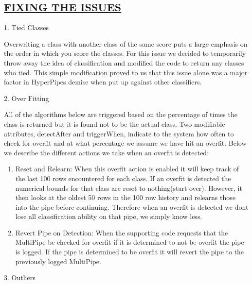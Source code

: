 \begin{kasten}
    \section*{ \hspace{0.1cm} {\color{red} \underline{FIXING THE ISSUES}}}
    \large{

      1. Tied Classes
\vspace{3 mm}

Overwriting a class with another class of the same score puts a large emphasis on 
the order in which you score the classes. For this issue we 
decided to temporarily throw away the idea of classification 
and modified the code to return any classes who tied. This 
simple modification proved to us that this issue alone was a 
major factor in HyperPipes demise when put up against other 
classifiers. 

\vspace{3 mm}
      2. Over Fitting
\vspace{3 mm}

All of the algorithms below are triggered 
based on the percentage of times the class is returned but it is 
found not to be the actual class. Two modifiable attributes, detectAfter
and triggerWhen, indicate to the system how often to check for 
overfit and at what percentage we assume we have hit an overfit. 
Below we describe the different actions we take when an overfit
is detected:
\begin{enumerate}
\item Reset and Relearn: 
	When this overfit action is enabled it will keep track of the 
	last 100 rows encountered for each class. If an overfit is detected 
	the numerical bounds for that class are reset to nothing(start over).
	However, it then looks at the oldest 50 rows in the 100 row history 
	and relearns those into the pipe before continuing. Therefore when
	an overfit is detected we dont lose all classification ability on that
	pipe, we simply know less.
\item Revert Pipe on Detection:
	When the supporting code requests that the MultiPipe
	be checked for overfit if it is determined to not be overfit the 
	pipe is logged. If the pipe is determined to be overfit it will revert 
	the pipe to the previously logged MultiPipe.
	
\end{enumerate}

\vspace{3 mm}
      3. Outliers
\vspace{3 mm}

}
\end{kasten}
